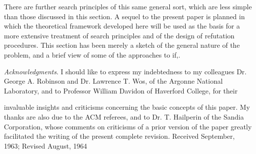\documentclass[8pt]{extarticle}
\begin{document}
There are further search principles of this same general sort, which are less simple than those discussed in this section. A sequel to the present paper is planned in which the theoretical framework developed here will be used as the basis for a more extensive treatment of search principles and of the design of refutation procedures. This section has been merely a sketch of the general nature of the problem, and a brief view of some of the approaches to if,.

\emph{Acknowledgments}. I should like to express my indebtedness to my colleagues Dr. George A. Robinson and Dr. Lawrence T. Wos, of the Argonne National Laboratory, and to Professor William Davidon of Haverford College, for their


invaluable insights and criticisms concerning the basic concepts of this paper. My thanks are also due to the ACM referees, and to Dr. T. Hailperin of the Sandia Corporation, whose comments on criticisms of a prior version of the paper greatly facilitated the writing of the present complete revision.
\noindent
Received September, 1963; Revised August, 1964


\end{document}
